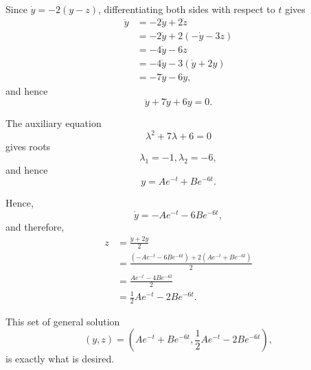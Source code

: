 \Question{\currfilebase}

Since \(\dot{y} = -2(y - z)\), differentiating both sides with respect to \(t\) gives
\begin{align*}
    \ddot{y} & = -2 \dot{y} + 2 \dot{z}           \\
             & = -2 \dot{y} + 2 (- \dot{y} - 3 z) \\
             & = -4 \dot{y} - 6z                  \\
             & = -4 \dot{y} - 3(\dot{y} + 2y)     \\
             & = -7 \dot{y} - 6y,
\end{align*}
and hence
\[
    \ddot{y} + 7\dot{y} + 6y = 0.
\]

The auxiliary equation
\[
    \lambda^2 + 7 \lambda + 6 = 0
\]
gives roots
\[
    \lambda_{1} = -1, \lambda_{2} = -6,
\]
and hence
\[
    y = Ae^{-t} + Be^{-6t}.
\]

Hence,
\[
    \dot{y} = -Ae^{-t} - 6Be^{-6t},
\]
and therefore,
\begin{align*}
    z & = \frac{\dot{y} + 2y}{2}                                   \\
      & = \frac{(-Ae^{-t} - 6Be^{-6t}) + 2(Ae^{-t} + Be^{-6t})}{2} \\
      & = \frac{Ae^{-t} - 4Be^{-6t}}{2}                            \\
      & = \frac{1}{2}A e^{-t} - 2B e^{-6t}.
\end{align*}

This set of general solution
\[
    (y, z) = \left(Ae^{-t} + Be^{-6t}, \frac{1}{2}A e^{-t} - 2B e^{-6t}\right),
\]
is exactly what is desired.

